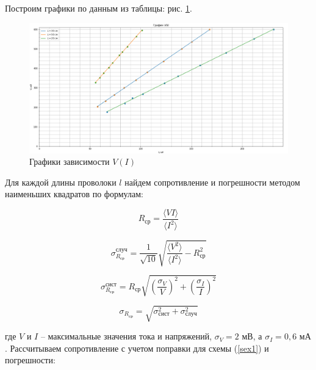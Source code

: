 \documentclass[a4paper, 12pt]{article}
\begin{document}
	Построим графики по данным из таблицы: рис. \ref{graph}.
	\begin{figure}[h!]
		\includegraphics[scale = 0.55]{1.1.1_graph}
		\caption{Графики зависимости $V(I)$}
		\label{graph}
	\end{figure}
	
	Для каждой длины проволоки $l$ найдем  сопротивление и погрешности методом наименьших квадратов по формулам:
	
	\begin{equation}
		R_\text{ср} = \frac{\langle VI\rangle}{\langle I^2 \rangle}
	\end{equation}


	\begin{minipage}{0.45\textwidth}
		\centering
		\begin{equation}
			\sigma_{R_\text{ср}}^{\text{случ}} = \frac{1}{\sqrt{10}}\sqrt{\frac{\langle V^2 \rangle}{\langle I^2 \rangle} - R_\text{ср}^2}
		\end{equation}
	\end{minipage}
	\begin{minipage}{0.45\textwidth}
		\centering
		
		\begin{equation}
			\sigma_{R_\text{ср}}^{\text{сист}} = R_\text{ср}\sqrt{\left(\frac{\sigma_V}{V} \right)^2 + \left(\frac{\sigma_I}{I} \right)^2}
		\end{equation}
	\end{minipage}
	
	\begin{equation}
		\sigma_{R_\text{ср}} = \sqrt{\sigma_{\text{сист}}^2 + \sigma_{\text{случ}}^2}
	\end{equation}
	
	\noindent где $V$ и $I$ -- максимальные значения тока и напряжений, $\sigma_V = 2 \text{ мВ}$, а $\sigma_I = 0,6 \text{ мА}$. Рассчитываем сопротивление с учетом поправки для схемы (\ref{sex1}) и погрешности:
	
\end{document}
